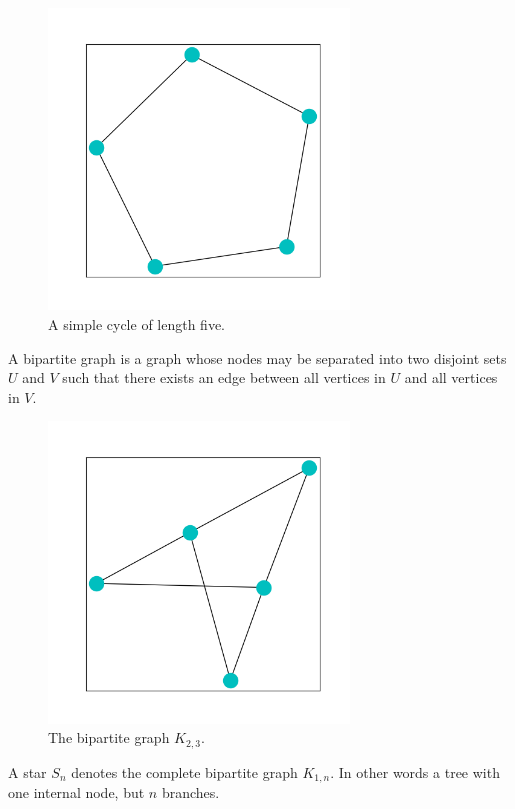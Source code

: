 \begin{figure}[h!]
    \includegraphics[width=8cm]{Images/Cycle.png}
    \centering
    \caption{A simple cycle of length five.}
\end{figure}

\begin{dfn}
    A bipartite graph is a graph whose nodes may be separated into two disjoint sets $U$ and $V$
    such that there exists an edge between all vertices in $U$ and all vertices in $V$.
\end{dfn}


\begin{figure}[h!]
    \includegraphics[width=8cm]{Images/Bipartite.png}
    \centering
    \caption{The bipartite graph $K_{2,3}$.}
\end{figure}

\FloatBarrier

\begin{dfn}
    A star $S_n$ denotes the complete bipartite graph $K_{1,n}$. In other words 
    a tree with one internal node, but $n$ branches.
\end{dfn}

